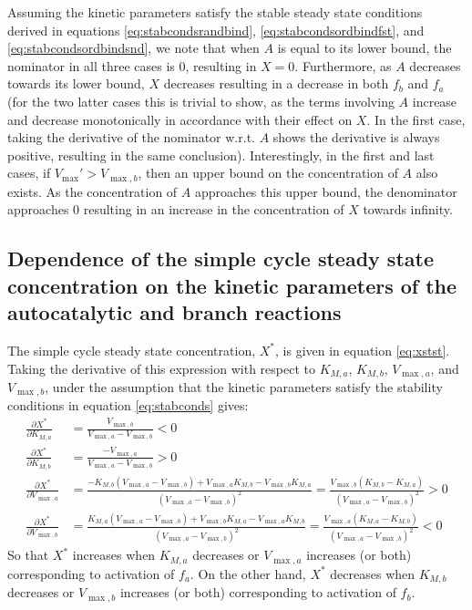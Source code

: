   Assuming the kinetic parameters satisfy the stable steady state conditions derived in equations \ref{eq:stabcondsrandbind}, \ref{eq:stabcondsordbindfst}, and \ref{eq:stabcondsordbindsnd}, we note that when $A$ is equal to its lower bound, the nominator in all three cases is $0$, resulting in $X=0$.
  Furthermore, as $A$ decreases towards its lower bound, $X$ decreases resulting in a decrease in both $f_b$ and $f_a$ (for the two latter cases this is trivial to show, as the terms involving $A$ increase and decrease monotonically in accordance with their effect on $X$. In the first case, taking the derivative of the nominator w.r.t. $A$ shows the derivative is always positive, resulting in the same conclusion).
  Interestingly, in the first and last cases, if $V_{\max}'>V_{\max,b}$, then an upper bound on the concentration of $A$ also exists.
  As the concentration of $A$ approaches this upper bound, the denominator approaches $0$ resulting in an increase in the concentration of $X$ towards infinity.

  \subsection{Dependence of the simple cycle steady state concentration on the kinetic parameters of the autocatalytic and branch reactions}
  The simple cycle steady state concentration, $X^*$, is given in equation \ref{eq:xstst}.
  Taking the derivative of this expression with respect to $K_{M,a}$, $K_{M,b}$, $V_{\max,a}$, and $V_{\max,b}$, under the assumption that the kinetic parameters satisfy the stability conditions in equation \ref{eq:stabconds} gives:
  \begin{align*}
    \frac{\partial X^*}{\partial K_{M,a}}&=\frac{V_{\max,b}}{V_{\max,a}-V_{\max,b}}<0 \\
    \frac{\partial X^*}{\partial K_{M,b}}&=\frac{-V_{\max,a}}{V_{\max,a}-V_{\max,b}}>0 \\
    \frac{\partial X^*}{\partial V_{\max,a}}&=\frac{-K_{M,b}(V_{\max,a}-V_{\max,b})+V_{\max,a}K_{M,b}-V_{\max,b}K_{M,a}}{(V_{\max,a}-V_{\max,b})^2}=\frac{V_{\max,b}(K_{M,b}-K_{M,a})}{(V_{\max,a}-V_{\max,b})^2}>0 \\
    \frac{\partial X^*}{\partial V_{\max,b}}&=\frac{K_{M,a}(V_{\max,a}-V_{\max,b})+V_{\max,b}K_{M,a}-V_{\max,a}K_{M,b}}{(V_{\max,a}-V_{\max,b})^2}=\frac{V_{\max,a}(K_{M,a}-K_{M,b})}{(V_{\max,a}-V_{\max,b})^2}<0
  \end{align*}
  So that $X^*$ increases when $K_{M,a}$ decreases or $V_{\max,a}$ increases (or both) corresponding to activation of $f_a$.
  On the other hand, $X^*$ decreases when $K_{M,b}$ decreases or $V_{\max,b}$ increases (or both) corresponding to activation of $f_b$.
